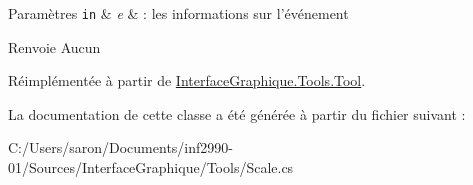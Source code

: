 \begin{DoxyParams}[1]{Paramètres}
\mbox{\tt in}  & {\em e} & \-: les informations sur l'événement\\
\hline
\end{DoxyParams}
\begin{DoxyReturn}{Renvoie}
Aucun 
\end{DoxyReturn}


Réimplémentée à partir de \hyperlink{class_interface_graphique_1_1_tools_1_1_tool_aedd1c93f96ee602475b7cbc3c9c99baa}{Interface\-Graphique.\-Tools.\-Tool}.



La documentation de cette classe a été générée à partir du fichier suivant \-:\begin{DoxyCompactItemize}
\item 
C\-:/\-Users/saron/\-Documents/inf2990-\/01/\-Sources/\-Interface\-Graphique/\-Tools/Scale.\-cs\end{DoxyCompactItemize}
